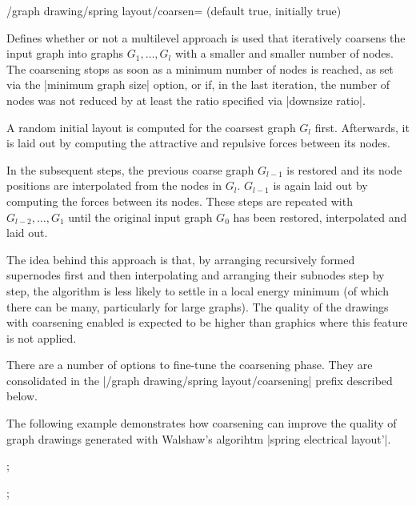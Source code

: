 \begin{key}{/graph drawing/spring layout/coarsen=
  (default true, initially true)}

  Defines whether or not a multilevel approach is used that
  iteratively coarsens the input graph into graphs $G_1,\dots,G_l$ with 
  a smaller and smaller number of nodes. The coarsening stops as soon as
  a minimum number of nodes is reached, as set via the 
  |minimum graph size| option, or if, in the last iteration, the 
  number of nodes was not reduced by at least the ratio specified via 
  |downsize ratio|. 

  A random initial layout is computed for the coarsest graph $G_l$ first.
  Afterwards, it is laid out by computing the attractive and repulsive
  forces between its nodes. 
  
  In the subsequent steps, the previous coarse graph $G_{l-1}$ is 
  restored and its node positions are interpolated from the nodes in 
  $G_l$. $G_{l-1}$ is again laid out by computing the forces between 
  its nodes. These steps are repeated with $G_{l-2},\dots,G_1$ until 
  the original input graph $G_0$ has been restored, interpolated 
  and laid out.

  The idea behind this approach is that, by arranging recursively 
  formed supernodes first and then interpolating and arranging their
  subnodes step by step, the algorithm is less likely to settle in a
  local energy minimum (of which there can be many, particularly for
  large graphs). The quality of the drawings with coarsening enabled is
  expected to be higher than graphics where this feature is not applied.

  There are a number of options to fine-tune the coarsening phase.
  They are consolidated in the |/graph drawing/spring layout/coarsening|
  prefix described below.

  The following example demonstrates how coarsening can improve the
  quality of graph drawings generated with Walshaw's algorihtm 
  |spring electrical layout'|.
  \begin{codeexample}[width=5cm]
\tikz {};

\tikz {};
  \end{codeexample}
\end{key}

